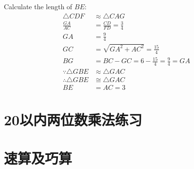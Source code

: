 \documentclass{exam}
\begin{document}
Calculate the length of $BE$:
\begin{align}
	\triangle CDF            & \approx \triangle CAG                               \\
	\frac{GA}{AC}            & = \frac{CD}{FD} = \frac{3}{4}                       \\
	GA                       & = \frac{9}{4}                                       \\
	GC                       & = \sqrt{GA^2 + AC^2} = \frac{15}{4}                 \\
	BG                       & = BC - GC = 6 - \frac{15}{4}     = \frac{9}{4} = GA \\
	\because \triangle GBE   & \approx \triangle GAC                               \\
	\therefore \triangle GBE & \cong \triangle GAC                                 \\
	BE                       & = AC = 3
\end{align}

\section*{20以内两位数乘法练习}
\begin{center}

\end{center}

\section{速算及巧算}
\end{document}
